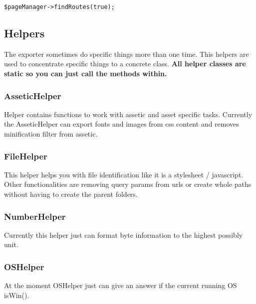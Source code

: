 \begin{verbatim}
$pageManager->findRoutes(true);
\end{verbatim}

\subsection{Helpers}
The exporter sometimes do specific things more than one time. This helpers are used to concentrate specific things to a concrete class. \textbf{All helper classes are static so you can just call the methods within.}

\subsubsection{AsseticHelper}
Helper contains functions to work with assetic and asset specific tasks. Currently the AsseticHelper can export fonts and images from css content and removes minification filter from assetic.

\subsubsection{FileHelper}
This helper helps you with file identification like it is a stylesheet / javascript. Other functionalities are removing query params from urls or create whole paths without having to create the parent folders.

\subsubsection{NumberHelper}
Currently this helper just can format byte information to the highest possibly unit.

\subsubsection{OSHelper}
At the moment OSHelper just can give an answer if the current running OS isWin().

